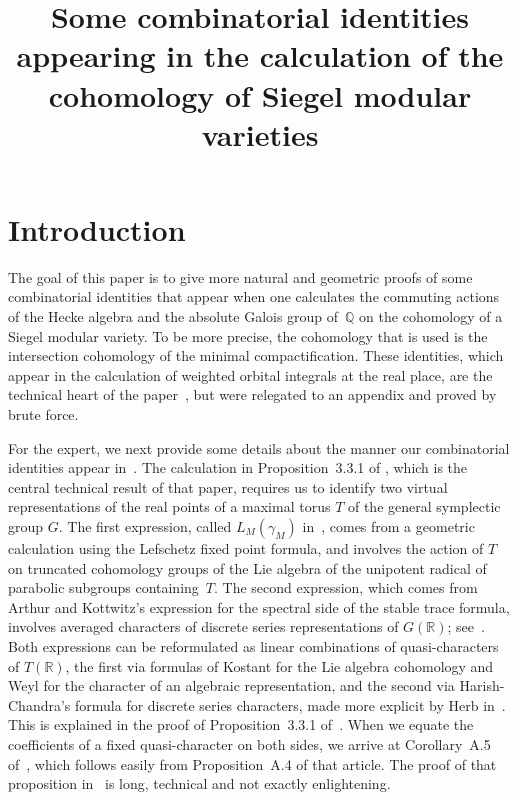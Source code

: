 \documentclass[ALCO,ThmDefs,Unicode,epreuves]{cedram}
\author{\firstname{Richard} \lastname{Ehrenborg}} %
\author{\firstname{Sophie} \lastname{Morel}}
\author{\firstname{Margaret} \lastname{Readdy}}
\title[Some combinatorial identities]
{Some combinatorial identities appearing in
the calculation of the cohomology of Siegel modular varieties}
\newcommand{\Rrr}{\mathbb{R}}
\newcommand{\Qqq}{\mathbb{Q}}
\newcommand{\R}{\Rrr}
\begin{document}
\maketitle

\section{Introduction}

The goal of this paper is to give more natural and geometric proofs
of some combinatorial identities that appear when one calculates
the commuting actions of the Hecke algebra and the absolute Galois group
of~$\Qqq$ on
the cohomology of a Siegel modular variety. To be more precise, the cohomology that is
used is
the intersection
cohomology of the minimal compactification. These identities, which
appear in the calculation of weighted orbital integrals at the real place,
are the technical heart of the paper~\cite{Morel}, but 
were relegated to an appendix and proved by brute force. 




For the expert,
we next provide some details about the manner our combinatorial identities
appear in~\cite{Morel}.
The calculation in Proposition~3.3.1 of
\cite{Morel}, which is the central technical result of that
paper, requires us to identify
two virtual representations of the real points of a maximal torus $T$ of
the general symplectic group $G$. The first expression, called
$L_M(\gamma_M)$ in~\cite[Section 1.2]{Morel},
comes from a
geometric calculation using the Lefschetz fixed point formula, and involves
the action of $T$ on truncated cohomology groups of the Lie algebra of the
unipotent radical of parabolic subgroups containing~$T$. 
The second
expression, which comes from Arthur and Kottwitz's expression for the
spectral side of the stable trace formula, involves averaged characters of
discrete series representations of $G(\R)$; 
see~\cite[Section 3.1]{Morel}. Both expressions can be reformulated
as linear combinations of quasi-characters of $T(\R)$, the first  via
formulas of Kostant for the Lie algebra cohomology and Weyl for the character
of an algebraic representation, and the second via Harish-Chandra's
formula for discrete series characters, made more explicit by Herb
in~\cite{Herb}. This is explained in the proof of Proposition~3.3.1
of~\cite{Morel}.
When we equate the coefficients of a fixed quasi-character
on both sides, we arrive at Corollary~A.5 of~\cite{Morel}, which follows
easily from Proposition~A.4 of that article.  The proof of that
proposition in~\cite{Morel} is long, technical and not exactly enlightening.
\end{document}
